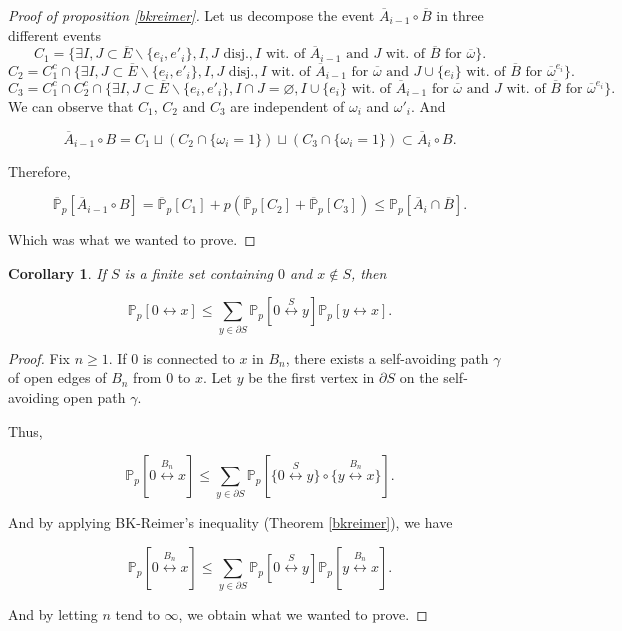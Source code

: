\documentclass[a4paper,11pt]{article}
\theoremstyle{plain}
\newtheorem{corollary}[theorem]{Corollary}
\theoremstyle{definition}
\theoremstyle{remark}
\begin{document}
\begin{proof}[Proof of proposition \ref{bkreimer}]
Let us decompose the event $\overline{A}_{i - 1} \circ \overline{B}$ in three different events
\[ C_1 = \{\exists I, J \subset \overline{E} \backslash \{e_i, e'_i\}, I, J \text{ disj.}, I \text{ wit. of } \overline{A}_{i - 1} \text{ and } J \text{ wit. of } \overline{B} \text{ for } \overline{\omega}\}. \]
\[ C_2 = C_1^c \cap \{\exists I, J \subset \overline{E} \backslash \{e_i, e'_i\}, I, J \text{ disj.}, I \text{ wit. of } \overline{A}_{i - 1} \text{ for } \overline{\omega} \text{ and } J\cup\{e_i\} \text{ wit. of } \overline{B} \text{ for } \overline{\omega}^{e_i}\}. \]
\[ C_3 = C_1^c \cap C_2^c \cap \{\exists I, J \subset \overline{E} \backslash \{e_i, e'_i\}, I \cap J = \varnothing, I\cup\{e_i\} \text{ wit. of } \overline{A}_{i - 1} \text{ for } \overline{\omega} \text{ and } J \text{ wit. of } \overline{B} \text{ for } \overline{\omega}^{e_i}\}. \]
We can observe that $C_1$, $C_2$ and $C_3$ are independent of $\omega_i$ and $\omega'_i$.
And

\[\overline{A}_{i - 1} \circ B = C_1 \sqcup (C_2 \cap \{\omega_i = 1\}) \sqcup (C_3 \cap \{\omega_i = 1\}) \subset \overline{A}_{i} \circ B.\]

Therefore,

\[\overline{\mathbb{P}}_p[\overline{A}_{i - 1} \circ B] = \overline{\mathbb{P}}_p[C_1] + p(\overline{\mathbb{P}}_p[C_2] + \overline{\mathbb{P}}_p[C_3]) \leq \mathbb{P}_p[\overline{A}_i \cap \overline{B}].\]

Which was what we wanted to prove.
\end{proof}

\begin{corollary}
If $S$ is a finite set containing $0$ and $x \not\in S$, then

\[ \mathbb{P}_p[0 \longleftrightarrow x] \leq \sum_{y \in \partial S}{\mathbb{P}_p[0 \stackrel{S}{\longleftrightarrow} y]\mathbb{P}_p[y \longleftrightarrow x]}. \]
\end{corollary}

\begin{proof}
Fix $n \geq 1$. If $0$ is connected to $x$ in $B_n$, there exists a self-avoiding path $\gamma$ of open edges of $B_n$ from $0$ to $x$. Let $y$ be the first vertex in $\partial S$ on the self-avoiding open path $\gamma$.

Thus,

\[ \mathbb{P}_p[0 \stackrel{B_n}{\longleftrightarrow} x] \leq \sum_{y \in \partial S}{\mathbb{P}_p[\{0 \stackrel{S}{\longleftrightarrow} y\} \circ \{y \stackrel{B_n}{\longleftrightarrow} x\}]}.\]

And by applying BK-Reimer's inequality (Theorem \ref{bkreimer}), we have

\[ \mathbb{P}_p[0 \stackrel{B_n}{\longleftrightarrow} x] \leq \sum_{y \in \partial S}{\mathbb{P}_p[0 \stackrel{S}{\longleftrightarrow} y]\mathbb{P}_p[y \stackrel{B_n}{\longleftrightarrow} x]}.\]

And by letting $n$ tend to $\infty$, we obtain what we wanted to prove.
\end{proof}
\end{document}

